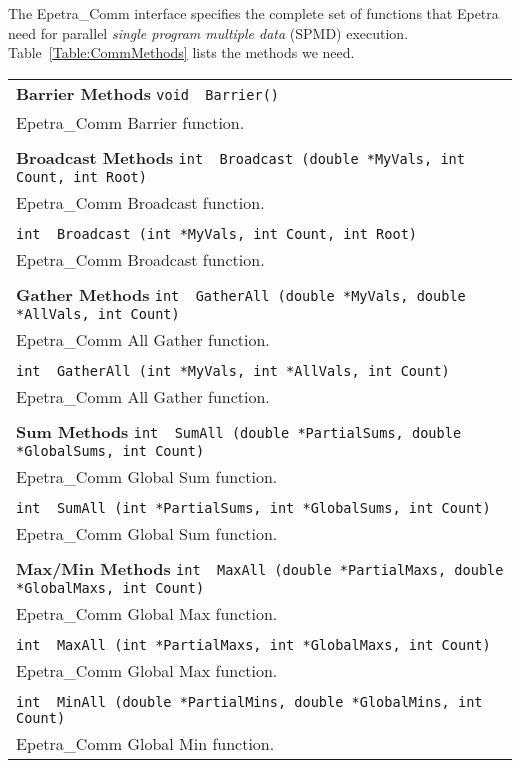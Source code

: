 \documentclass[12pt,relax]{EpetraUserGuide}
\newcommand{\comm}{Epetra\_Comm}
\begin{document}
The \comm{} interface specifies the complete set of functions that Epetra need
for parallel {\it single program multiple data} (SPMD) execution.
Table~\ref{Table:CommMethods} lists the methods we need.
\begin{table}
\scriptsize
\begin{center}
\begin{tabular}{ | p{15cm} | }
\hline {\bf Barrier Methods}
\verb!void  Barrier()!\\
  \comm{} Barrier function.\\
\\
{\bf Broadcast Methods }
\verb!int  Broadcast (double *MyVals, int Count, int Root)!\\
  \comm{} Broadcast function. \\
\\
\verb!int  Broadcast (int *MyVals, int Count, int Root)!\\
  \comm{} Broadcast function. \\
\\
{\bf Gather Methods }
\verb!int  GatherAll (double *MyVals, double *AllVals, int Count)!\\
  \comm{} All Gather function. \\
\\
\verb!int  GatherAll (int *MyVals, int *AllVals, int Count)!\\
  \comm{} All Gather function. \\
\\
{\bf Sum Methods }
\verb!int  SumAll (double *PartialSums, double *GlobalSums, int Count)!\\
  \comm{} Global Sum function. \\
 \\
\verb!int  SumAll (int *PartialSums, int *GlobalSums, int Count)!\\
  \comm{} Global Sum function. \\
 \\
{\bf Max/Min Methods }
\verb!int  MaxAll (double *PartialMaxs, double *GlobalMaxs, int Count)!\\
  \comm{} Global Max function. \\
 \\
\verb!int  MaxAll (int *PartialMaxs, int *GlobalMaxs, int Count)!\\
  \comm{} Global Max function. \\
 \\
\verb!int  MinAll (double *PartialMins, double *GlobalMins, int Count)!\\
  \comm{} Global Min function. \\

\end{tabular}
\end{center}
\end{table}
\end{document}
